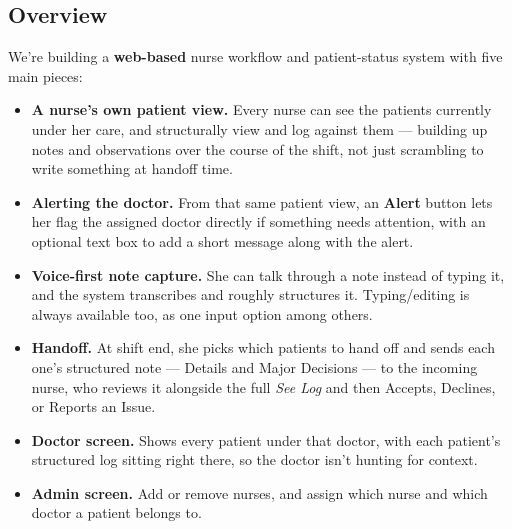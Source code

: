 \documentclass[11pt,a4paper]{article}
\begin{document}
\subsection{Overview}
We're building a \textbf{web-based} nurse workflow and
patient-status system with five main pieces:
\begin{itemize}[leftmargin=0.7cm]
    \item \textbf{A nurse's own patient view.} Every nurse can see the patients currently under her care, and structurally view and log against them --- building up notes and observations over the course of the shift, not just scrambling to write something at handoff time.
    \item \textbf{Alerting the doctor.} From that same patient view, an \textbf{Alert} button lets her flag the assigned doctor directly if something needs attention, with an optional text box to add a short message along with the alert.
    \item \textbf{Voice-first note capture.} She can talk through a note instead of typing it, and the system transcribes and roughly structures it. Typing/editing is always available too, as one input option among others.
    \item \textbf{Handoff.} At shift end, she picks which patients to hand off and sends each one's structured note --- Details and Major Decisions --- to the incoming nurse, who reviews it alongside the full \emph{See Log} and then Accepts, Declines, or Reports an Issue.
    \item \textbf{Doctor screen.} Shows every patient under that doctor, with each patient's structured log sitting right there, so the doctor isn't hunting for context.
    \item \textbf{Admin screen.} Add or remove nurses, and assign which nurse and which doctor a patient belongs to.
\end{itemize}
\end{document}
